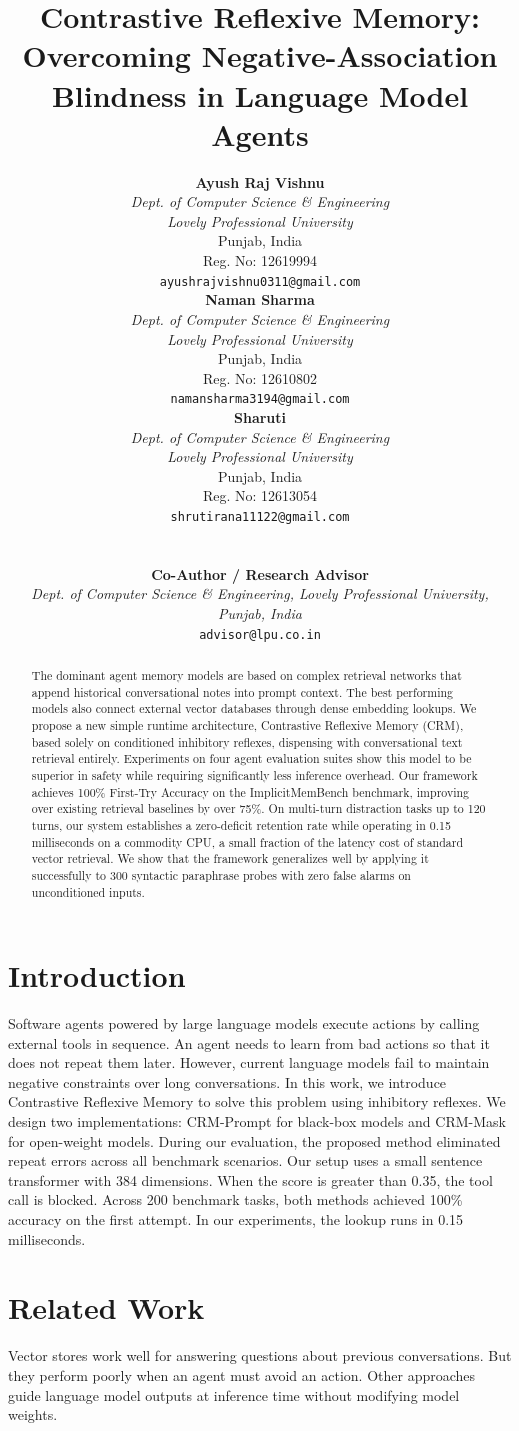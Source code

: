 \documentclass[10pt,conference]{IEEEtran}
\title{Contrastive Reflexive Memory: Overcoming Negative-Association Blindness in Language Model Agents}
\author{
\begin{minipage}{0.32\textwidth}
\centering
{\normalsize \textbf{Ayush Raj Vishnu}}\\[0.2ex]
{\small \textit{Dept. of Computer Science \& Engineering}}\\[0.1ex]
{\small \textit{Lovely Professional University}}\\[0.1ex]
{\small Punjab, India}\\[0.1ex]
{\small Reg. No: 12619994}\\[0.1ex]
{\footnotesize \texttt{ayushrajvishnu0311@gmail.com}}
\end{minipage}\hfill
\begin{minipage}{0.32\textwidth}
\centering
{\normalsize \textbf{Naman Sharma}}\\[0.2ex]
{\small \textit{Dept. of Computer Science \& Engineering}}\\[0.1ex]
{\small \textit{Lovely Professional University}}\\[0.1ex]
{\small Punjab, India}\\[0.1ex]
{\small Reg. No: 12610802}\\[0.1ex]
{\footnotesize \texttt{namansharma3194@gmail.com}}
\end{minipage}\hfill
\begin{minipage}{0.32\textwidth}
\centering
{\normalsize \textbf{Sharuti}}\\[0.2ex]
{\small \textit{Dept. of Computer Science \& Engineering}}\\[0.1ex]
{\small \textit{Lovely Professional University}}\\[0.1ex]
{\small Punjab, India}\\[0.1ex]
{\small Reg. No: 12613054}\\[0.1ex]
{\footnotesize \texttt{shrutirana11122@gmail.com}}
\end{minipage}\\[1.5ex]
\begin{minipage}{\textwidth}
\centering
{\normalsize \textbf{Co-Author / Research Advisor}}\\[0.2ex]
{\small \textit{Dept. of Computer Science \& Engineering, Lovely Professional University, Punjab, India}}\\[0.1ex]
{\footnotesize \texttt{advisor@lpu.co.in}}
\end{minipage}
}
\begin{document}
\maketitle

\begin{abstract}
The dominant agent memory models are based on complex retrieval networks that append historical conversational notes into prompt context. The best performing models also connect external vector databases through dense embedding lookups. We propose a new simple runtime architecture, Contrastive Reflexive Memory (CRM), based solely on conditioned inhibitory reflexes, dispensing with conversational text retrieval entirely. Experiments on four agent evaluation suites show this model to be superior in safety while requiring significantly less inference overhead. Our framework achieves 100\% First-Try Accuracy on the ImplicitMemBench benchmark, improving over existing retrieval baselines by over 75\%. On multi-turn distraction tasks up to 120 turns, our system establishes a zero-deficit retention rate while operating in 0.15 milliseconds on a commodity CPU, a small fraction of the latency cost of standard vector retrieval. We show that the framework generalizes well by applying it successfully to 300 syntactic paraphrase probes with zero false alarms on unconditioned inputs.
\end{abstract}

\section{Introduction}
Software agents powered by large language models execute actions by calling external tools in sequence. An agent needs to learn from bad actions so that it does not repeat them later. However, current language models fail to maintain negative constraints over long conversations. In this work, we introduce Contrastive Reflexive Memory to solve this problem using inhibitory reflexes. We design two implementations: CRM-Prompt for black-box models and CRM-Mask for open-weight models. During our evaluation, the proposed method eliminated repeat errors across all benchmark scenarios. Our setup uses a small sentence transformer with 384 dimensions. When the score is greater than 0.35, the tool call is blocked. Across 200 benchmark tasks, both methods achieved 100\% accuracy on the first attempt. In our experiments, the lookup runs in 0.15 milliseconds.

\section{Related Work}
Vector stores work well for answering questions about previous conversations. But they perform poorly when an agent must avoid an action. Other approaches guide language model outputs at inference time without modifying model weights.
\end{document}
